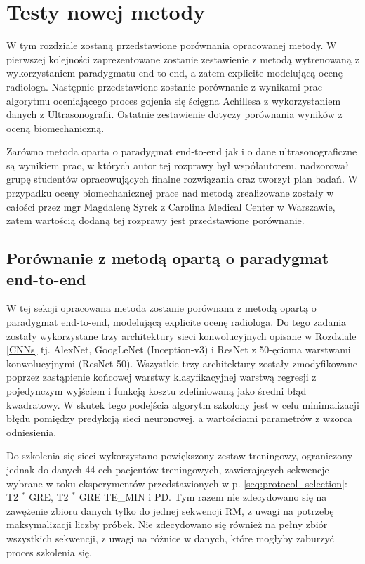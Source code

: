 \chapter{Testy nowej metody}

W tym rozdziale zostaną przedstawione porównania opracowanej metody. W pierwszej kolejności zaprezentowane zostanie zestawienie z metodą wytrenowaną z wykorzystaniem paradygmatu end-to-end, a zatem explicite modelującą ocenę radiologa. Następnie przedstawione zostanie porównanie z wynikami prac algorytmu oceniającego proces gojenia się ścięgna Achillesa z wykorzystaniem danych z Ultrasonografii. Ostatnie zestawienie dotyczy porównania wyników z oceną biomechaniczną.

Zarówno metoda oparta o paradygmat end-to-end jak i o dane ultrasonograficzne są wynikiem prac, w których autor tej rozprawy był współautorem, nadzorował grupę studentów opracowujących finalne rozwiązania oraz tworzył plan badań. W przypadku oceny biomechanicznej prace nad metodą zrealizowane zostały w całości przez mgr Magdalenę Syrek z Carolina Medical Center w Warszawie, zatem wartością dodaną tej rozprawy jest przedstawione porównanie.   

\section{Porównanie z metodą opartą o paradygmat end-to-end}
\label{seq:end-to-end}
W tej sekcji opracowana metoda zostanie porównana z metodą opartą o paradygmat end-to-end, modelującą explicite ocenę radiologa. Do tego zadania zostały wykorzystane trzy architektury sieci konwolucyjnych opisane w Rozdziale \ref{CNNs} tj. AlexNet, GoogLeNet (Inception-v3) i ResNet z 50-ęcioma warstwami konwolucyjnymi (ResNet-50). Wszystkie trzy architektury zostały zmodyfikowane poprzez zastąpienie końcowej warstwy klasyfikacyjnej warstwą regresji z pojedynczym wyjściem i funkcją kosztu zdefiniowaną jako średni błąd kwadratowy. W skutek tego podejścia algorytm szkolony jest w celu minimalizacji błędu pomiędzy predykcją sieci neuronowej, a wartościami parametrów z wzorca odniesienia. 

Do szkolenia się sieci wykorzystano powiększony zestaw treningowy, ograniczony jednak do danych 44-ech pacjentów treningowych, zawierających sekwencje wybrane w toku eksperymentów przedstawionych w p. \ref{seq:protocol_selection}: T2 $^\ast$ GRE, T2 $^\ast$ GRE TE\_MIN i PD. Tym razem nie zdecydowano się na zawężenie zbioru danych tylko do jednej sekwencji RM, z uwagi na potrzebę maksymalizacji liczby próbek. Nie zdecydowano się również na pełny zbiór wszystkich sekwencji, z uwagi na różnice w danych, które mogłyby zaburzyć proces szkolenia się. 

